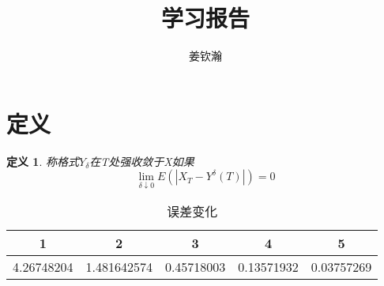 \documentclass{article}%
\title{学习报告}
\author{姜钦瀚}
\newtheorem{definition}{\bf 定义}[section]
\begin{document}
	\maketitle
\section{定义}
\begin{definition}
称格式$Y_\delta$在T处强收敛于X如果	
\begin{equation}
\lim _{\delta \downarrow 0} E\left(\left|X_{T}-Y^{\delta}(T)\right|\right)=0
\end{equation}
\end{definition}
\begin{table}[htbp]
	\centering
	\caption{误差变化}
	\begin{tabular}{ccccc}
		\toprule  %
		1&2&3&4&5 \\ 
		\midrule  %
		4.26748204&1.481642574&0.45718003&0.13571932&0.03757269 \\
		\bottomrule  %
	\end{tabular}
\end{table}
\end{document}
